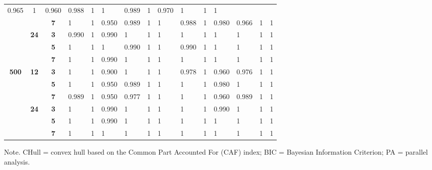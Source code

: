 \documentclass[a4paper,man,natbib]{apa6}
\begin{document}
\begin{table}[]
{\begin{tabular}{cccllllllllllll}
		0.965 &
		1 &
		0.960 &
		0.988 &
		1 &
		1 &
		0.989 &
		1 &
		0.970 &
		1 &
		1 &
		1 \\ \cline{3-15} 
		&
		&
		\textbf{7} &
		1 &
		1 &
		0.950 &
		0.989 &
		1 &
		1 &
		0.988 &
		1 &
		0.980 &
		0.966 &
		1 &
		1 \\ \cline{2-15} 
		&
		\multirow{3}{*}{\textbf{24}} &
		\textbf{3} &
		0.990 &
		1 &
		0.990 &
		1 &
		1 &
		1 &
		1 &
		1 &
		1 &
		1 &
		1 &
		1 \\ \cline{3-15} 
		&
		&
		\textbf{5} &
		1 &
		1 &
		1 &
		0.990 &
		1 &
		1 &
		0.990 &
		1 &
		1 &
		1 &
		1 &
		1 \\ \cline{3-15} 
		&
		&
		\textbf{7} &
		1 &
		1 &
		0.990 &
		1 &
		1 &
		1 &
		1 &
		1 &
		1 &
		1 &
		1 &
		1 \\ \hline
		\multirow{6}{*}{\textbf{500}} &
		\multirow{3}{*}{\textbf{12}} &
		\textbf{3} &
		1 &
		1 &
		0.900 &
		1 &
		1 &
		1 &
		0.978 &
		1 &
		0.960 &
		0.976 &
		1 &
		1 \\ \cline{3-15} 
		&
		&
		\textbf{5} &
		1 &
		1 &
		0.950 &
		0.989 &
		1 &
		1 &
		1 &
		1 &
		0.980 &
		1 &
		1 &
		1 \\ \cline{3-15} 
		&
		&
		\textbf{7} &
		0.989 &
		1 &
		0.950 &
		0.977 &
		1 &
		1 &
		1 &
		1 &
		0.960 &
		0.989 &
		1 &
		1 \\ \cline{2-15} 
		&
		\multirow{3}{*}{\textbf{24}} &
		\textbf{3} &
		1 &
		1 &
		0.990 &
		1 &
		1 &
		1 &
		1 &
		1 &
		0.990 &
		1 &
		1 &
		1 \\ \cline{3-15} 
		&
		&
		\textbf{5} &
		1 &
		1 &
		0.990 &
		1 &
		1 &
		1 &
		1 &
		1 &
		1 &
		1 &
		1 &
		1 \\ \cline{3-15} 
		&
		&
		\textbf{7} &
		1 &
		1 &
		1 &
		1 &
		1 &
		1 &
		1 &
		1 &
		1 &
		1 &
		1 &
		1 \\ \hline
	\end{tabular}%
}
 \begin{tablenotes}[flushleft]
	\small
	\item 	Note. CHull = convex hull based on the Common Part Accounted For (CAF) index; BIC = Bayesian Information Criterion; PA = parallel analysis.
\end{tablenotes}
\end{table}
\end{document}
